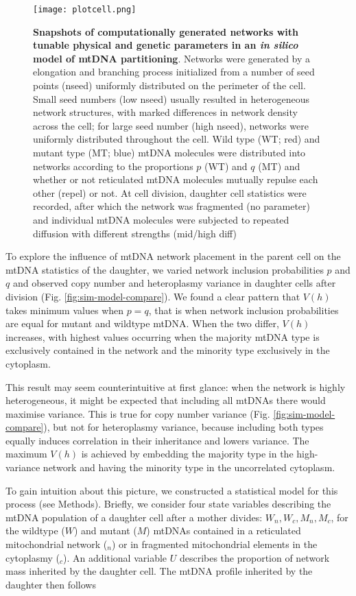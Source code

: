 \documentclass{article}
\begin{document}
\begin{figure}
\centering
\texttt{[image: plotcell.png]}
\caption{\textbf{Snapshots of computationally generated networks with tunable physical and genetic parameters in an \textit{in silico} model of mtDNA partitioning}. Networks were generated by a elongation and branching process initialized from a number of seed points (nseed) uniformly distributed on the perimeter of the cell. Small seed numbers (low nseed) usually resulted in heterogeneous network structures, with marked differences in network density across the cell; for large seed number (high nseed), networks were uniformly distributed throughout the cell. Wild type (WT; red) and mutant type (MT; blue) mtDNA molecules were distributed into networks according to the proportions $p$ (WT) and $q$ (MT) and whether or not reticulated mtDNA molecules mutually repulse each other (repel) or not. At cell division, daughter cell statistics were recorded, after which the network was fragmented (no parameter) and individual mtDNA molecules were subjected to repeated diffusion with different strengths (mid/high diff)}\label{fig:plotcell}
\end{figure}

To explore the influence of mtDNA network placement in the parent cell on the mtDNA statistics of the daughter, we varied network inclusion probabilities $p$ and $q$ and observed copy number and heteroplasmy variance in daughter cells after division (Fig. \ref{fig:sim-model-compare}). We found a clear pattern that $V(h)$ takes minimum values when $p=q$, that is when network inclusion probabilities are equal for mutant and wildtype mtDNA. When the two differ, $V(h)$ increases, with highest values occurring when the majority mtDNA type is exclusively contained in the network and the minority type exclusively in the cytoplasm. 

This result may seem counterintuitive at first glance: when the network is highly heterogeneous, it might be expected that including all mtDNAs there would maximise variance. This is true for copy number variance (Fig. \ref{fig:sim-model-compare}), but not for heteroplasmy variance, because including both types equally induces correlation in their inheritance and lowers variance. The maximum $V(h)$ is achieved by embedding the majority type in the high-variance network and having the minority type in the uncorrelated cytoplasm. 

To gain intuition about this picture, we constructed a statistical model for this process (see Methods). Briefly, we consider four state variables describing the mtDNA population of a daughter cell after a mother divides: $W_n, W_c, M_n, M_c$, for the wildtype ($W$) and mutant ($M$) mtDNAs contained in a reticulated mitochondrial network (${}_n$) or in fragmented mitochondrial elements in the cytoplasmy (${}_c$). An additional variable $U$ describes the proportion of network mass inherited by the daughter cell. The mtDNA profile inherited by the daughter then follows
\end{document}
